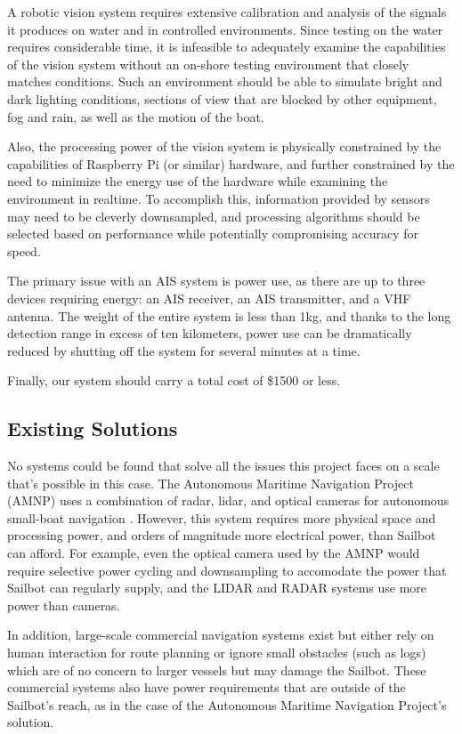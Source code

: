 A robotic vision system requires extensive calibration and analysis of the signals it produces on water and in controlled environments. Since testing on the water requires considerable time, it is infeasible to adequately examine the capabilities of the vision system without an on-shore testing environment that closely matches conditions. Such an environment should be able to simulate bright and dark lighting conditions, sections of view that are blocked by other equipment, fog and rain, as well as the motion of the boat.

Also, the processing power of the vision system is physically constrained by the capabilities of Raspberry Pi (or similar) hardware, and further constrained by the need to minimize the energy use of the hardware while examining the environment in realtime. To accomplish this, information provided by sensors may need to be cleverly downsampled, and processing algorithms should be selected based on performance while potentially compromising accuracy for speed.

The primary issue with an AIS system is power use, as there are up to three devices requiring energy: an AIS receiver, an AIS transmitter, and a VHF antenna. The weight of the entire system is less than 1kg, and thanks to the long detection range in excess of ten kilometers, power use can be dramatically reduced by shutting off the system for several minutes at a time.

Finally, our system should carry a total cost of \$1500 or less.

\subsection{\label{sec:intro:existing-solutions}Existing Solutions}
No systems could be found that solve all the issues this project faces on a scale that's possible in this case. The Autonomous Maritime Navigation Project (AMNP) uses a combination of radar, lidar, and optical cameras for autonomous small-boat navigation \cite{AMN}. However, this system requires more physical space and processing power, and orders of magnitude more electrical power, than Sailbot can afford. For example, even the optical camera used by the AMNP would require selective power cycling and downsampling to accomodate the power that Sailbot can regularly supply, and the LIDAR and RADAR systems use more power than cameras.

In addition, large-scale commercial navigation systems exist but either rely on human interaction for route planning or ignore small obstacles (such as logs) which are of no concern to larger vessels but may damage the Sailbot. These commercial systems also have power requirements that are outside of the Sailbot's reach, as in the case of the Autonomous Maritime Navigation Project's solution. 

